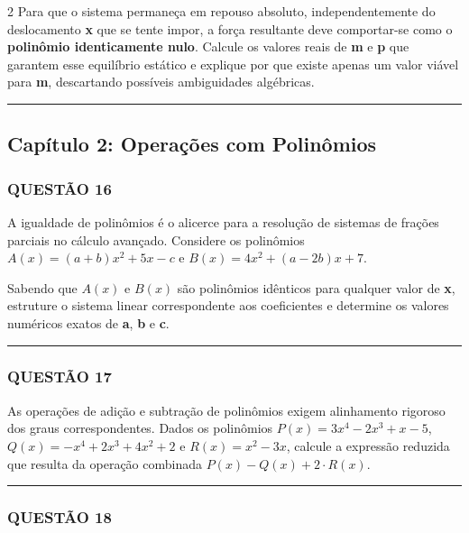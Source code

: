 \documentclass[twoside, 10pt, a4paper]{article}
\begin{document}
\begin{multicols*}{2}
Para que o sistema permaneça em repouso absoluto, independentemente do deslocamento \textbf{x} que se tente impor, a força resultante deve comportar-se como o \textbf{polinômio identicamente nulo}. Calcule os valores reais de \textbf{m} e \textbf{p} que garantem esse equilíbrio estático e explique por que existe apenas um valor viável para \textbf{m}, descartando possíveis ambiguidades algébricas.

\vspace{0cm} \noindent\textcolor{CorLinha}{\rule{\linewidth}{0.5pt}} \vspace{-0.2cm}
\subsection*{Capítulo 2: Operações com Polinômios}
\subsubsection*{QUESTÃO 16}

A igualdade de polinômios é o alicerce para a resolução de sistemas de frações parciais no cálculo avançado. Considere os polinômios $ A(x) = (a + b)x^2 + 5x - c $ e $ B(x) = 4x^2 + (a - 2b)x + 7 $.

Sabendo que $ A(x) $ e $ B(x) $ são polinômios idênticos para qualquer valor de \textbf{x}, estruture o sistema linear correspondente aos coeficientes e determine os valores numéricos exatos de \textbf{a}, \textbf{b} e \textbf{c}.

\vspace{0cm} \noindent\textcolor{CorLinha}{\rule{\linewidth}{0.5pt}} \vspace{-0.2cm}
\subsubsection*{QUESTÃO 17}

As operações de adição e subtração de polinômios exigem alinhamento rigoroso dos graus correspondentes. Dados os polinômios $ P(x) = 3x^4 - 2x^3 + x - 5 $, $ Q(x) = -x^4 + 2x^3 + 4x^2 + 2 $ e $ R(x) = x^2 - 3x $, calcule a expressão reduzida que resulta da operação combinada $ P(x) - Q(x) + 2 \cdot R(x) $.

\vspace{0cm} \noindent\textcolor{CorLinha}{\rule{\linewidth}{0.5pt}} \vspace{-0.2cm}
\subsubsection*{QUESTÃO 18}


\end{multicols*}
\end{document}
